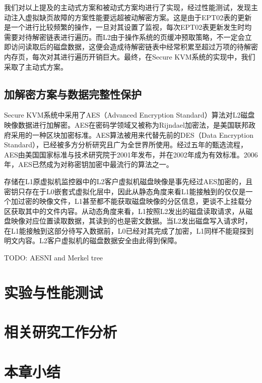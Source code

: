 我们对以上提及的主动式方案和被动式方案均进行了实现，经过性能测试，发现主动注入虚拟缺页故障的方案性能要远超被动解密方案。这是由于EPT02表的更新是一个进行比较频繁的操作，一旦对其设置了监视，每次EPT02表更新发生时均需要对待解密链表进行遍历。而L2由于操作系统的页缓冲预取策略，不一定会立即访问读取后的磁盘数据，这便会造成待解密链表中经常积累至超过万项的待解密内存页，每次对其进行遍历开销巨大。最终，在Secure KVM系统的实现中，我们采取了主动式方案。

\subsection{加解密方案与数据完整性保护}

Secure KVM系统中采用了AES（Advanced Encryption Standard）算法对L2磁盘映像数据进行加解密。AES在密码学领域又被称为Rijndael加密法，是美国联邦政府采用的一种区块加密标准。AES算法被用来代替先前的DES（Data Encryption Standard），已经被多方分析研究且广为全世界所使用。经过五年的甄选流程，AES由美国国家标准与技术研究院于2001年发布，并在2002年成为有效标准。2006年，AES已然成为对称密钥加密中最流行的算法之一。

存储在L1原虚拟机监控器中的L2客户虚拟机磁盘映像是事先经过AES加密的，且密钥只存在于L0嵌套式虚拟化层中，因此从静态角度来看L1能接触到的仅仅是一个加过密的映像文件，L1甚至都不能获取磁盘映像的分区信息，更谈不上挂载分区获取其中的文件内容。从动态角度来看，L1按照L2发出的磁盘读取请求，从磁盘映像对应位置读取数据，其读到的也是密文数据。当L2发出磁盘写入请求时，在L1能接触到这部分待写入数据前，L0已经对其完成了加密，L1同样不能窥探到明文内容。L2客户虚拟机的磁盘数据安全由此得到保障。

TODO: AESNI and Merkel tree







\section{实验与性能测试}



\section{相关研究工作分析}



\section{本章小结}
